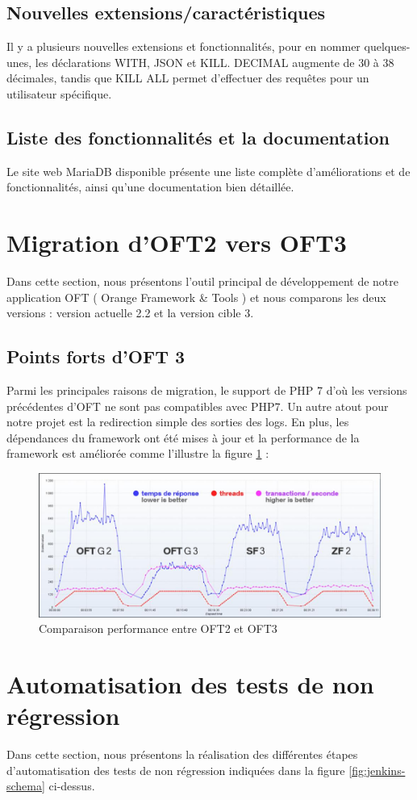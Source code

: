 \subsection{Nouvelles extensions/caractéristiques}
Il y a plusieurs nouvelles extensions et fonctionnalités, pour en nommer quelques-unes, les déclarations WITH, JSON et KILL. DECIMAL augmente de 30 à 38 décimales, tandis que KILL ALL permet d'effectuer des requêtes pour un utilisateur spécifique.\cite{mysql-maria}
\subsection{Liste des fonctionnalités et la documentation}
Le site web MariaDB disponible présente une liste complète d'améliorations et de fonctionnalités, ainsi qu’une documentation bien détaillée.\cite{mysql-maria}
\section{Migration d’OFT2 vers OFT3}
Dans cette section, nous présentons l’outil principal de développement de notre application OFT ( Orange Framework \& Tools ) et nous comparons les deux versions : version actuelle 2.2 et la version cible 3.
\subsection{Points forts d’OFT 3}
Parmi les principales raisons de migration, le support de PHP 7 d’où les versions précédentes  d’OFT ne sont pas compatibles avec PHP7. Un autre atout pour notre projet est la redirection simple des sorties des logs. En plus, les dépendances du framework ont été mises à jour et la performance de la framework est améliorée comme l'illustre la figure \ref{fig:oft-3} :
\begin{figure}[H]
	\centering
	\includegraphics[width=0.7\linewidth]{img/oft-3}
	\caption[Comparaison performance entre OFT2 et OFT3]{Comparaison performance entre OFT2 et OFT3\cite{oft-doc}}
	\label{fig:oft-3}
\end{figure}
\section[Automatisation des tests de non régression]{Automatisation des tests de non régression}
Dans cette section, nous présentons la réalisation des différentes étapes d’automatisation des tests de non régression indiquées dans la figure \ref{fig:jenkins-schema} ci-dessus.
